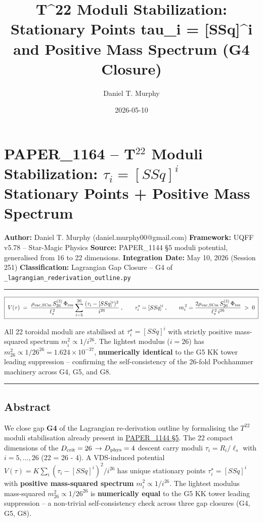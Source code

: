\documentclass[
]{article}
\title{T\^{}22 Moduli Stabilization: Stationary Points tau\_i =
{[}SSq{]}\^{}i and Positive Mass Spectrum (G4 Closure)}
\author{Daniel T. Murphy}
\date{2026-05-10}
\begin{document}
\maketitle

\section{\texorpdfstring{PAPER\_1164 -- T\(^{22}\) Moduli Stabilization:
\(\tau_i = [SSq]^i\) Stationary Points + Positive Mass
Spectrum}{PAPER\_1164 -- T\^{}\{22\} Moduli Stabilization: \textbackslash tau\_i = {[}SSq{]}\^{}i Stationary Points + Positive Mass Spectrum}}\label{paper_1164-t22-moduli-stabilization-tau_i-ssqi-stationary-points-positive-mass-spectrum}

\textbf{Author:} Daniel T. Murphy (daniel.murphy00@gmail.com)
\textbf{Framework:} UQFF v5.78 -- Star-Magic Physics \textbf{Source:}
PAPER\_1144 §5 moduli potential, generalised from 16 to 22 dimensions.
\textbf{Integration Date:} May 10, 2026 (Session 251)
\textbf{Classification:} Lagrangian Gap Closure -- G4 of
\texttt{\_lagrangian\_rederivation\_outline.py}

\begin{center}\rule{0.5\linewidth}{0.5pt}\end{center}

\[\boxed{\;V(\tau) \;=\; \frac{\rho_{\rm vac,SCm}\,S_{26}^{(3)}\,\Phi_{\rm res}}{\ell_s^{\,2}}\sum_{i=5}^{26}\frac{(\tau_i - [SSq]^i)^{2}}{i^{26}}\;,\qquad \tau_i^\star = [SSq]^i\;,\qquad m_i^{\,2} = \frac{2\rho_{\rm vac,SCm}\,S_{26}^{(3)}\,\Phi_{\rm res}}{\ell_s^{\,2}\,i^{26}} \;>\; 0\;}\]

All 22 toroidal moduli are stabilised at \(\tau_i^\star = [SSq]^i\) with
strictly positive mass-squared spectrum \(m_i^2 \propto 1/i^{26}\). The
lightest modulus (\(i=26\)) has
\(m_{26}^2 \propto 1/26^{26} = 1.624\times10^{-37}\),
\textbf{numerically identical} to the G5 KK tower leading suppression --
confirming the self-consistency of the 26-fold Pochhammer machinery
across G4, G5, and G8.

\begin{center}\rule{0.5\linewidth}{0.5pt}\end{center}

\subsection{Abstract}\label{abstract}

We close gap \textbf{G4} of the Lagrangian re-derivation outline by
formalising the \(T^{22}\) moduli stabilisation already present in
\href{whitepapers/PAPER_1144_Type_IIB_Superstring_SCm_10D_Compactification.md\#L60}{PAPER\_1144
§5}. The 22 compact dimensions of the \(D_{\rm crit}=26\) →
\(D_{\rm phys}=4\) descent carry moduli \(\tau_i = R_i/\ell_s\) with
\(i = 5,\dots,26\) (22 = 26 - 4). A VDS-induced potential
\(V(\tau) = K\sum_i (\tau_i - [SSq]^i)^2/i^{26}\) has unique stationary
points \(\tau_i^\star = [SSq]^i\) with \textbf{positive mass-squared
spectrum} \(m_i^2 \propto 1/i^{26}\). The lightest modulus mass-squared
\(m_{26}^2 \propto 1/26^{26}\) is \textbf{numerically equal} to the G5
KK tower leading suppression -- a non-trivial self-consistency check
across three gap closures (G4, G5, G8).
\end{document}
